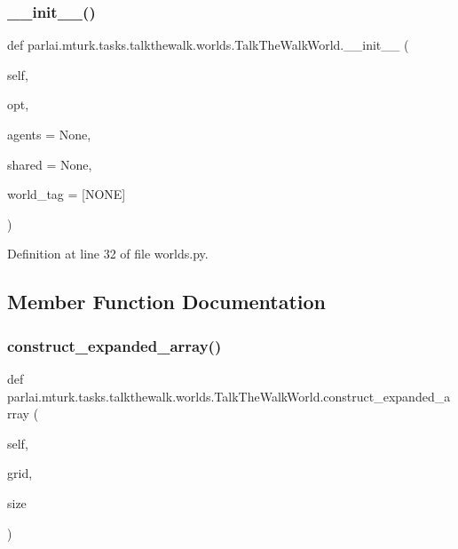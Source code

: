 \subsubsection{\texorpdfstring{\+\_\+\+\_\+init\+\_\+\+\_\+()}{\_\_init\_\_()}}
{\footnotesize\ttfamily def parlai.\+mturk.\+tasks.\+talkthewalk.\+worlds.\+Talk\+The\+Walk\+World.\+\_\+\+\_\+init\+\_\+\+\_\+ (\begin{DoxyParamCaption}\item[{}]{self,  }\item[{}]{opt,  }\item[{}]{agents = {\ttfamily None},  }\item[{}]{shared = {\ttfamily None},  }\item[{}]{world\+\_\+tag = {\ttfamily \textquotesingle{}\mbox{[}NONE\mbox{]}\textquotesingle{}} }\end{DoxyParamCaption})}



Definition at line 32 of file worlds.\+py.



\subsection{Member Function Documentation}
\mbox{\label{classparlai_1_1mturk_1_1tasks_1_1talkthewalk_1_1worlds_1_1TalkTheWalkWorld_a563e21fcf5b38acb1db594a578fdf7f1}} 
\subsubsection{\texorpdfstring{construct\+\_\+expanded\+\_\+array()}{construct\_expanded\_array()}}
{\footnotesize\ttfamily def parlai.\+mturk.\+tasks.\+talkthewalk.\+worlds.\+Talk\+The\+Walk\+World.\+construct\+\_\+expanded\+\_\+array (\begin{DoxyParamCaption}\item[{}]{self,  }\item[{}]{grid,  }\item[{}]{size }\end{DoxyParamCaption})}

